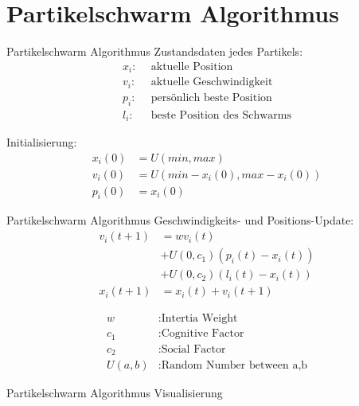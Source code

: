 \section[Algorithmus]{Partikelschwarm Algorithmus}
\begin{frame}{Partikelschwarm Algorithmus}
	Zustandsdaten jedes Partikels:
	\begin{align*}
		x_i: \: \: & \text{aktuelle Position}\\
		v_i: \: \: & \text{aktuelle Geschwindigkeit}\\
		p_i: \: \: & \text{persönlich beste Position} \\
		l_i: \: \: & \text{beste Position des Schwarms}
	\end{align*}
	

	Initialisierung:
	\begin{align*}
		x_i(0) &= U(min,max) \\
		v_i(0) &= U(min - x_i(0), max - x_i(0)) \\
		p_i(0) &= x_i(0)
	\end{align*}
	
\end{frame}

\begin{frame}{Partikelschwarm Algorithmus}
	Geschwindigkeits- und Positions-Update:
	\begin{align*}
		v_i(t+1) &= w v_i(t) \\
				&+ U(0,c_1) \left(p_i(t)-x_i(t) \right) \\
				&+ U(0,c_2) \left(l_i(t)-x_i(t) \right) \\
		x_{i}(t+1) &= x_i(t) + v_i(t+1)
	\end{align*}

	\begin{align*}
		w &: \text{Intertia Weight} \\
		c_1 &: \text{Cognitive Factor} \\
		c_2 &: \text{Social Factor} \\
		U(a,b) &: \text{Random Number between a,b}
	\end{align*}	
\end{frame}

\begin{frame}{Partikelschwarm Algorithmus}
	Visualisierung
	\begin{figure}[htbp]
		
	\end{figure}
\end{frame}